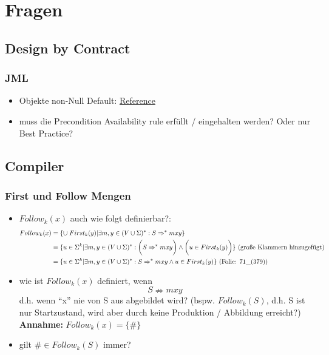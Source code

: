 \chapter{Fragen}
\section{Design by Contract}
\subsection{JML}
\begin{itemize}
	\item Objekte non-Null Default: \href{http://www.eecs.ucf.edu/~leavens/JML/jmlrefman/jmlrefman_2.html#SEC16}{Reference}
	\item muss die Precondition Availability rule  erfüllt / eingehalten werden? Oder nur Best Practice?
\end{itemize}

\section{Compiler}
\subsection{First und Follow Mengen}
\begin{itemize}
	\item $Follow_k(x)$ auch wie folgt definierbar?:
		\begin{align*}
			Follow_k(x) &= \{ \cup\; First_k(y) | \exists m,y \in (V \cup \Sigma)^* : S \Rightarrow^* mxy \}\\
						&= \{ u \in \Sigma^k | \exists m,y \in (V \cup \Sigma)^*: \bigg(S \Rightarrow^* mxy\bigg) \wedge \bigg( u \in First_k(y) \bigg) \} \text{ (große Klammern hinzugefügt)}\\
						&= \{ u \in \Sigma^k | \exists m,y \in (V \cup \Sigma)^*: S \Rightarrow^* mxy \wedge u \in First_k(y) \} \text{ (Folie: $71\_\text{(379)}$)}
		\end{align*}
	\item wie ist $Follow_k(x)$ definiert, wenn 
		$$S \nRightarrow mxy$$
		d.h. wenn \enquote{x} nie von S aus abgebildet wird? (bspw. $Follow_k(S)$, d.h. S ist nur Startzustand, wird aber durch keine Produktion / Abbildung erreicht?)\\
		\textbf{Annahme:} $Follow_k(x) = \{ \# \}$
	\item gilt $\# \in Follow_k(S)$ immer?
\end{itemize}
